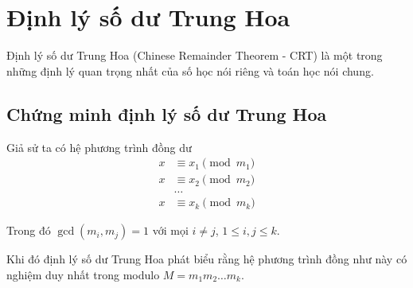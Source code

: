 \section{Định lý số dư Trung Hoa}

Định lý số dư Trung Hoa (Chinese Remainder Theorem - CRT) là một trong những định lý quan trọng nhất của số học nói riêng và toán học nói chung.

\subsection*{Chứng minh định lý số dư Trung Hoa}

Giả sử ta có hệ phương trình đồng dư
\begin{align*}
	x & \equiv x_1 \pmod{m_1} \\ x & \equiv x_2 \pmod{m_2} \\ & \ldots \\ x & \equiv x_k \pmod{m_k}
\end{align*}

Trong đó $\gcd(m_i, m_j) = 1$ với mọi $i \neq j$, $1 \leqslant i, j \leqslant k$.

Khi đó định lý số dư Trung Hoa phát biểu rằng hệ phương trình đồng như này có nghiệm duy nhất trong modulo $M = m_1 m_2 \ldots m_k$.

